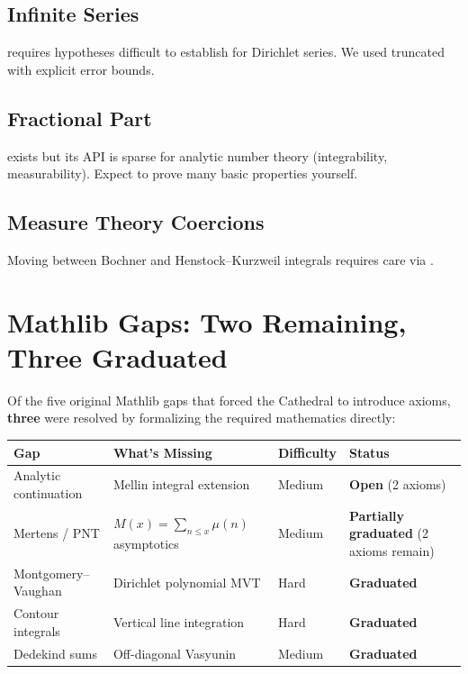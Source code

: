 \documentclass[11pt,a4paper]{article}
\begin{document}
\subsection{Infinite Series}

 requires  hypotheses difficult to
establish for Dirichlet series. We used truncated 
with explicit error bounds.

\subsection{Fractional Part}

 exists but its API is sparse for analytic number
theory (integrability, measurability). Expect to prove many basic
properties yourself.

\subsection{Measure Theory Coercions}

Moving between Bochner and Henstock--Kurzweil integrals requires
care via .

\section{Mathlib Gaps: Two Remaining, Three Graduated}
\label{sec:gaps}

Of the five original Mathlib gaps that forced the Cathedral to
introduce axioms, \textbf{three} were resolved by formalizing the
required mathematics directly:

\begin{center}
\begin{tabular}{@{}lp{4.2cm}ll@{}}
\toprule
\textbf{Gap} & \textbf{What's Missing} & \textbf{Difficulty} & \textbf{Status} \\
\midrule
Analytic continuation & Mellin integral extension & Medium & \textbf{Open} (2 axioms) \\
Mertens / PNT & $M(x) = \sum_{n \leq x}\mu(n)$ asymptotics & Medium & \textbf{Partially graduated} (2 axioms remain) \\
\midrule
Montgomery--Vaughan & Dirichlet polynomial MVT & Hard & \textbf{Graduated} \\
Contour integrals & Vertical line integration & Hard & \textbf{Graduated} \\
Dedekind sums & Off-diagonal Vasyunin & Medium & \textbf{Graduated} \\
\bottomrule
\end{tabular}
\end{center}
\end{document}
